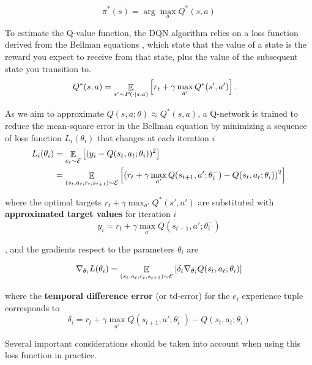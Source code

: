 \begin{equation}
    \pi^*(s) = \arg \max_a Q^* (s,a)
    \label{eq:optinal_q_policy}
\end{equation}

To estimate the Q-value function, the DQN algorithm relies on a loss function derived from the Bellman equations \cite{sutton2018reinforcement}, which state that the value of a state is the reward you expect to receive from that state, plus the value of the subsequent state you transition to.
\begin{align*}
Q^*(s,a) &= \mathop{\mathbb{E}}\limits_{s'\sim P(\cdot | s,a)}\left[r_t + \gamma \max_{a'} Q^*(s',a')\right].
\end{align*}

As we aim to approximate $Q(s, a; \theta) \approx Q^*(s, a)$, a Q-network is trained to reduce the mean-square error in the Bellman equation by minimizing a sequence of loss function $L_i(\theta_i)$ that changes at each iteration $i$
\begin{align*}
    L_i (\theta_i) & = \mathop{\mathbb{E}}\limits_{e_t \sim \mathcal{E}}\left[(y_i - Q(s_t, a_t; \theta_i))^2\right] \\
    & = \mathop{\mathbb{E}}\limits_{(s_t, a_t, r_t, s_{t+1}) \sim \mathcal{E}}\left[(r_t + \gamma \max_{a'} Q(s_{t+1}, a'; \theta^-_{i}) - Q(s_t, a_t; \theta_i))^2\right] 
\end{align*}

where the optimal targets $r_t + \gamma \max_{a'} Q^*(s',a')$ are substituted with \textbf{approximated target values} for iteration $i$
\begin{equation}
    y_i = r_t + \gamma \max_{a'} Q(s_{t+1}, a'; \theta^-_{i})
\end{equation}

, and the gradients respect to the parameters $\theta_i$ are

\begin{equation}
    \nabla_{\theta_i} L(\theta_i) = \mathop{\mathbb{E}}\limits_{(s_t, a_t, r_t, s_{t+1}) \sim \mathcal{E}}\left[ \delta_t \nabla_{\theta_i}Q(s_t, a_t; \theta_i)\right] 
\end{equation}

where the \textbf{temporal difference error} (or td-error) for the $e_i$ experience tuple corresponds to
\begin{equation}
    \delta_i = r_t + \gamma \max_{a'} Q(s_{t+1}, a'; \theta^-_{i}) - Q(s_t, a_t; \theta_i)
\end{equation}

Several important considerations should be taken into account when using this loss function in practice.

